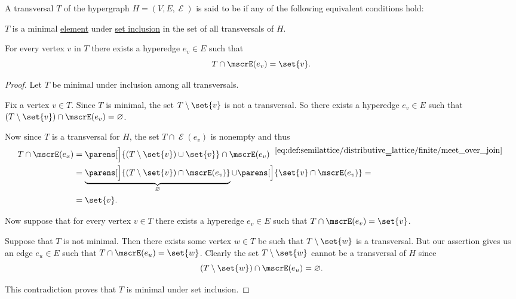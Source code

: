 \begin{definition}\label{def:hypergraph_minimal_transversal}
  A transversal \( T \) of the hypergraph \( H = (V, E, \mscrE) \) is said to be  if any of the following equivalent conditions hold:
  \begin{thmenum}
     \( T \) is a minimal \hyperref[def:partially_ordered_set_extremal_points/maximal_and_minimal_element]{element} under \hyperref[def:subset]{set inclusion} in the set of all transversals of \( H \).

     For every vertex \( v \) in \( T \) there exists a hyperedge \( e_v \in E \) such that
    \begin{equation*}
      T \cap \mscrE(e_v) = \set{ v }.
    \end{equation*}
  \end{thmenum}
\end{definition}
\begin{proof}
   Let \( T \) be minimal under inclusion among all transversals.

  Fix a vertex \( v \in T \). Since \( T \) is minimal, the set \( T \setminus \set{ v } \) is not a transversal. So there exists a hyperedge \( e_v \in E \) such that \( (T \setminus \set{ v }) \cap \mscrE(e_v) = \varnothing \).

  Now since \( T \) is a transversal for \( H \), the set \( T \cap \mscrE(e_v) \) is nonempty and thus
  \begin{align*}
    T \cap \mscrE(e_x)
    &=
    \parens[\Big]{ (T \setminus \set{ v }) \cup \set{ v } } \cap \mscrE(e_v)
    \reloset {\eqref{eq:def:semilattice/distributive_lattice/finite/meet_over_join}} = \\ &=
    \underbrace{\parens[\Big]{ (T \setminus \set{ v }) \cap \mscrE(e_v) }}_{\varnothing} \cup \parens[\Big]{ \set{ v } \cap \mscrE(e_v) }
    = \\ &=
    \set{ v }.
  \end{align*}

   Now suppose that for every vertex \( v \in T \) there exists a hyperedge \( e_v \in E \) such that \( T \cap \mscrE(e_v) = \set{ v } \).

  Suppose that \( T \) is not minimal. Then there exists some vertex \( w \in T \) be such that \( T \setminus \set{ w } \) is a transversal. But our assertion gives us an edge \( e_u \in E \) such that \( T \cap \mscrE(e_u) = \set{ w } \). Clearly the set \( T \setminus \set{ w } \) cannot be a transversal of \( H \) since
  \begin{equation*}
    (T \setminus \set{ w }) \cap \mscrE(e_u) = \varnothing.
  \end{equation*}

  This contradiction proves that \( T \) is minimal under set inclusion.
\end{proof}

